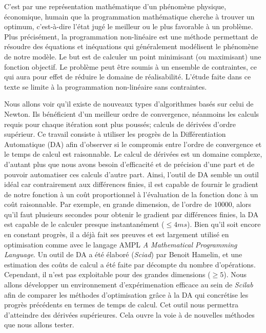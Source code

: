 \documentclass[caractereUtf,maitrise]{style/scienceUdeS}
\newcommand{\co}{}
\begin{document}
C'est par une repr\'esentation math\'ematique d'un ph\'enom\`ene physique, \'economique, humain que la programmation math\'ematique cherche \`a trouver
un optimum, c'est-\`a-dire l'\'etat jug\'e le meilleur ou le plus favorable \`a un probl\`eme. Plus pr\'ecis\'ement, la programmation non-lin\'eaire
est une m\'ethode permettant de r\'esoudre des \'equations et in\'equations qui g\'en\'eralement mod\'elisent le ph\'enom\`ene de notre mod\`ele.
Le but est de calculer un point minimisant (ou maximisant) une fonction objectif. Le probl\`eme peut être soumis \`a un ensemble de contraintes,
ce qui aura pour effet de r\'eduire le domaine de r\'ealisabilit\'e.
L'\'etude faite dans ce texte se limite \`a la programmation non-lin\'eaire sans contraintes. 
{\co 
Nous allons voir qu'il existe de nouveaux types d'algorithmes bas\'es sur celui de Newton. Ils b\'en\'eficient d'un meilleur ordre de convergence,
n\'eanmoins les calculs requis pour chaque it\'eration sont plus pouss\'es; calculs de d\'eriv\'ees d'ordre sup\'erieur.
 Ce travail consiste \`a utiliser les progr\`es de la Diff\'erentiation Automatique (DA) afin d'observer si le compromis entre l'ordre de convergence
et le temps de calcul est raisonnable.
 Le calcul de d\'eriv\'ees est un domaine complexe, d'autant plus que nous avons besoin d'efficacit\'e et de pr\'ecision d'une part et de pouvoir automatiser
ces calculs d'autre part.
Ainsi, l'outil de DA semble un outil id\'eal car contrairement aux diff\'erences finies, il est capable de fournir
le gradient de notre fonction \`a un coût proportionnel \`a l'\'evaluation de la fonction donc \`a un coût raisonnable. Par exemple, en grande dimension,
 de l'ordre de $10000$, alors qu'il faut plusieurs secondes pour obtenir le gradient par diff\'erences finies, la DA est capable de le calculer
 presque instantan\'ement ($\leq 4ms$). Bien qu'il soit encore en constant progr\`es, il a d\'ej\`a fait ses preuves
et est largement utilis\'e en optimisation comme avec le langage AMPL {\it A Mathematical Programming Language}.  
Un outil de DA a \'et\'e \'elabor\'e ({\it Sciad}) par Benoit Hamelin, et une estimation des coûts de calcul a \'et\'e faite 
par d\'ecompte du nombre d'op\'erations. Cependant, il n'est pas exploitable pour des grandes dimensions ($\geq 5$).
Nous allons d\'evelopper un environnement d'exp\'erimenation efficace au sein de {\it Scilab} afin de comparer les m\'ethodes d'optimisation
grâce \`a la DA qui concr\'etise les progr\`es pr\'ec\'edents en termes de temps de calcul.
Cet outil nous permettra d'atteindre des d\'eriv\'ees sup\'erieures. Cela ouvre la voie \`a de nouvelles m\'ethodes que nous 
allons tester. 

}
\end{document}
